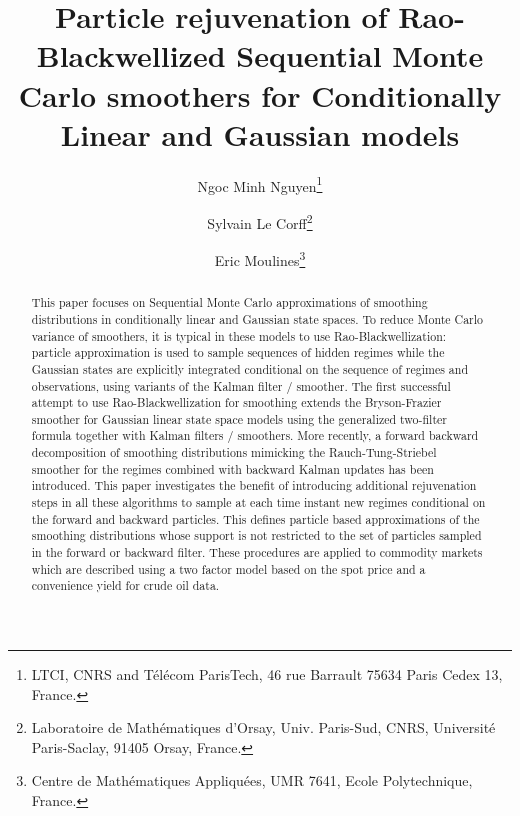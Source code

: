 \documentclass[nolayout]{article}
\theoremstyle{plain}
\theoremstyle{definition}
\newcommand{\1}{\mathbbm{1}}
\begin{document}
\title{Particle rejuvenation of Rao-Blackwellized Sequential Monte Carlo smoothers for Conditionally Linear and Gaussian models}
\date{}

\author{Ngoc Minh Nguyen\footnote{LTCI, CNRS and T\'el\'ecom ParisTech, 46 rue Barrault 75634 Paris Cedex 13, France.}\and Sylvain {L}e {C}orff\footnote{Laboratoire de Math\'ematiques d'Orsay, Univ. Paris-Sud, CNRS, Universit\'e Paris-Saclay, 91405 Orsay, France.}\and Eric Moulines\footnote{Centre de Math\'ematiques Appliqu\'ees, UMR 7641, Ecole Polytechnique, France.}}


\maketitle

\begin{abstract}
This paper focuses on Sequential Monte Carlo approximations of smoothing distributions in conditionally linear and Gaussian state spaces. To reduce Monte Carlo variance of smoothers, it is typical in these models to use Rao-Blackwellization: particle approximation is used to sample sequences of hidden regimes while the Gaussian states are explicitly integrated conditional on the sequence of regimes and observations, using variants of the Kalman filter / smoother. The first successful attempt to use Rao-Blackwellization for smoothing extends the Bryson-Frazier smoother for Gaussian linear state space models using the generalized two-filter formula together with Kalman filters / smoothers. More recently, a  forward backward decomposition of smoothing distributions mimicking the Rauch-Tung-Striebel smoother for the regimes combined with backward Kalman updates has been introduced.  
This paper investigates the benefit of introducing additional rejuvenation steps in all these algorithms to sample at each time instant new  regimes conditional on the forward and backward particles. This defines particle based approximations of the smoothing distributions whose support is not restricted to the set of particles sampled in the forward or backward filter. These procedures are applied to commodity markets which are described using a two factor model based on the spot price and a convenience yield for crude oil data.
\end{abstract}
\end{document}
